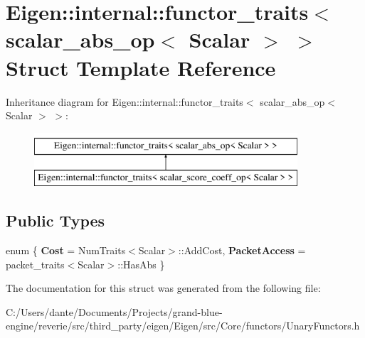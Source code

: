 \hypertarget{struct_eigen_1_1internal_1_1functor__traits_3_01scalar__abs__op_3_01_scalar_01_4_01_4}{}\section{Eigen\+::internal\+::functor\+\_\+traits$<$ scalar\+\_\+abs\+\_\+op$<$ Scalar $>$ $>$ Struct Template Reference}
\label{struct_eigen_1_1internal_1_1functor__traits_3_01scalar__abs__op_3_01_scalar_01_4_01_4}
Inheritance diagram for Eigen\+::internal\+::functor\+\_\+traits$<$ scalar\+\_\+abs\+\_\+op$<$ Scalar $>$ $>$\+:\begin{figure}[H]
\begin{center}
\leavevmode
\includegraphics[height=2.000000cm]{struct_eigen_1_1internal_1_1functor__traits_3_01scalar__abs__op_3_01_scalar_01_4_01_4}
\end{center}
\end{figure}
\subsection*{Public Types}
\begin{DoxyCompactItemize}
\item 
\mbox{\label{struct_eigen_1_1internal_1_1functor__traits_3_01scalar__abs__op_3_01_scalar_01_4_01_4_ad895b00fdc1935a4044abebdcdf87843}} 
enum \{ {\bfseries Cost} = Num\+Traits$<$Scalar$>$\+::Add\+Cost, 
{\bfseries Packet\+Access} = packet\+\_\+traits$<$Scalar$>$\+::Has\+Abs
 \}
\end{DoxyCompactItemize}


The documentation for this struct was generated from the following file\+:\begin{DoxyCompactItemize}
\item 
C\+:/\+Users/dante/\+Documents/\+Projects/grand-\/blue-\/engine/reverie/src/third\+\_\+party/eigen/\+Eigen/src/\+Core/functors/Unary\+Functors.\+h\end{DoxyCompactItemize}

